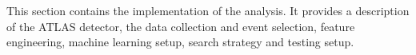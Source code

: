 This section contains the implementation of the analysis. It provides a description of the ATLAS detector, the data collection and event selection, 
feature engineering, machine learning setup, search strategy and testing setup. 